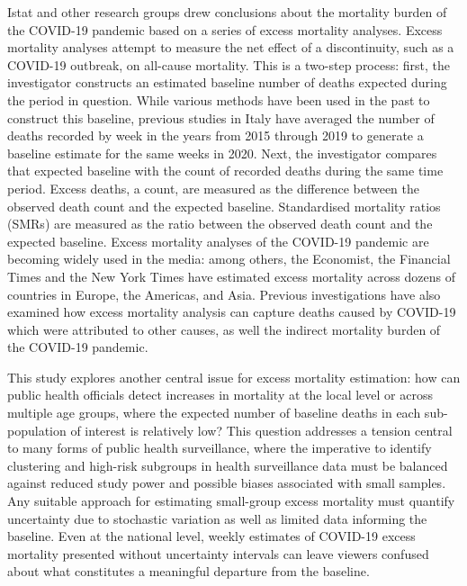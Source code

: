 \documentclass[
]{report}
\begin{document}
Istat and other research groups drew conclusions about the mortality burden of the COVID-19 pandemic based on a series of excess mortality analyses. Excess mortality analyses attempt to measure the net effect of a discontinuity, such as a COVID-19 outbreak, on all-cause mortality. This is a two-step process: first, the investigator constructs an estimated baseline number of deaths expected during the period in question. While various methods have been used in the past to construct this baseline\autocite{Serfling1963,Weinberger2020a,Noufaily2013}, previous studies in Italy have averaged the number of deaths recorded by week in the years from 2015 through 2019 to generate a baseline estimate for the same weeks in 2020\autocite{Alicandro2020,Michelozzi2020}. Next, the investigator compares that expected baseline with the count of recorded deaths during the same time period. Excess deaths, a count, are measured as the difference between the observed death count and the expected baseline. Standardised mortality ratios (SMRs) are measured as the ratio between the observed death count and the expected baseline\autocite{Dickman2004,Lambert2005}. Excess mortality analyses of the COVID-19 pandemic are becoming widely used in the media: among others, the Economist, the Financial Times and the New York Times have estimated excess mortality across dozens of countries in Europe, the Americas, and Asia\autocite{Wu2020,TheEconomist2020,FTVisualDataJournalismteam2020}. Previous investigations have also examined how excess mortality analysis can capture deaths caused by COVID-19 which were attributed to other causes, as well the indirect mortality burden of the COVID-19 pandemic\autocite{Weinberger2020a,U.S.NationalCenterforHealthStatistics2021}.

This study explores another central issue for excess mortality estimation: how can public health officials detect increases in mortality at the local level or across multiple age groups, where the expected number of baseline deaths in each sub-population of interest is relatively low? This question addresses a tension central to many forms of public health surveillance, where the imperative to identify clustering and high-risk subgroups in health surveillance data must be balanced against reduced study power and possible biases associated with small samples\autocite{Thacker1988}. Any suitable approach for estimating small-group excess mortality must quantify uncertainty due to stochastic variation as well as limited data informing the baseline. Even at the national level, weekly estimates of COVID-19 excess mortality presented without uncertainty intervals can leave viewers confused about what constitutes a meaningful departure from the baseline.
\end{document}
